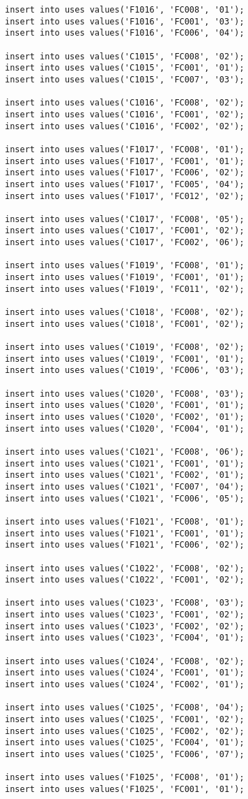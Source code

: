 \documentclass[a4,12pt]{report}
\begin{document}
\begin{lstlisting}
insert into uses values('F1016', 'FC008', '01');
insert into uses values('F1016', 'FC001', '03');
insert into uses values('F1016', 'FC006', '04');

insert into uses values('C1015', 'FC008', '02');
insert into uses values('C1015', 'FC001', '01');
insert into uses values('C1015', 'FC007', '03');

insert into uses values('C1016', 'FC008', '02');
insert into uses values('C1016', 'FC001', '02');
insert into uses values('C1016', 'FC002', '02');

insert into uses values('F1017', 'FC008', '01');
insert into uses values('F1017', 'FC001', '01');
insert into uses values('F1017', 'FC006', '02');
insert into uses values('F1017', 'FC005', '04');
insert into uses values('F1017', 'FC012', '02');

insert into uses values('C1017', 'FC008', '05');
insert into uses values('C1017', 'FC001', '02');
insert into uses values('C1017', 'FC002', '06');

insert into uses values('F1019', 'FC008', '01');
insert into uses values('F1019', 'FC001', '01');
insert into uses values('F1019', 'FC011', '02');

insert into uses values('C1018', 'FC008', '02');
insert into uses values('C1018', 'FC001', '02');

insert into uses values('C1019', 'FC008', '02');
insert into uses values('C1019', 'FC001', '01');
insert into uses values('C1019', 'FC006', '03');

insert into uses values('C1020', 'FC008', '03');
insert into uses values('C1020', 'FC001', '01');
insert into uses values('C1020', 'FC002', '01');
insert into uses values('C1020', 'FC004', '01');

insert into uses values('C1021', 'FC008', '06');
insert into uses values('C1021', 'FC001', '01');
insert into uses values('C1021', 'FC002', '01');
insert into uses values('C1021', 'FC007', '04');
insert into uses values('C1021', 'FC006', '05');

insert into uses values('F1021', 'FC008', '01');
insert into uses values('F1021', 'FC001', '01');
insert into uses values('F1021', 'FC006', '02');

insert into uses values('C1022', 'FC008', '02');
insert into uses values('C1022', 'FC001', '02');

insert into uses values('C1023', 'FC008', '03');
insert into uses values('C1023', 'FC001', '02');
insert into uses values('C1023', 'FC002', '02');
insert into uses values('C1023', 'FC004', '01');

insert into uses values('C1024', 'FC008', '02');
insert into uses values('C1024', 'FC001', '01');
insert into uses values('C1024', 'FC002', '01');

insert into uses values('C1025', 'FC008', '04');
insert into uses values('C1025', 'FC001', '02');
insert into uses values('C1025', 'FC002', '02');
insert into uses values('C1025', 'FC004', '01');
insert into uses values('C1025', 'FC006', '07');

insert into uses values('F1025', 'FC008', '01');
insert into uses values('F1025', 'FC001', '01');

\end{lstlisting}
\end{document}
